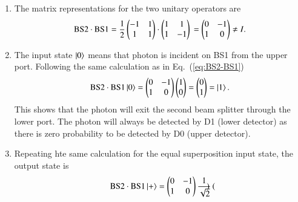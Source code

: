 \begin{solution}
\begin{enumerate}[label=(\alph*)]
    \item The matrix representations for the two unitary operators are
    \begin{equation*}
        \text{BS2}\cdot\text{BS1} = \frac{1}{2}\begin{pmatrix}
            -1 & 1 \\
            1 & 1
        \end{pmatrix} \cdot \begin{pmatrix}
            1 & 1 \\
            1 & -1
        \end{pmatrix} \\
        = \begin{pmatrix}
            0 & -1 \\
            1 & 0
        \end{pmatrix} \neq I.
    \end{equation*}
    \item The input state $\left| 0 \right\rangle$ means that photon is incident on BS1 from the upper port. Following the same calculation as in Eq.~(\ref{eq:BS2-BS1})
    \begin{equation*}
        \text{BS2}\cdot\text{BS1}\left| 0 \right\rangle = \begin{pmatrix}
            0 & -1 \\ 1 & 0
        \end{pmatrix} \begin{pmatrix}
            1 \\ 0
        \end{pmatrix} = \begin{pmatrix}
            0 \\ 1
        \end{pmatrix} = \left| 1 \right\rangle.
    \end{equation*}
    This shows that the photon will exit the second beam splitter through the lower port.
    The photon will always be detected by D1 (lower detector) as there is zero probability to be detected by D0 (upper detector).
    \item Repeating hte same calculation for the equal superposition input state, the output state is
    \begin{equation*}
        \text{BS2}\cdot\text{BS1}\left| + \right\rangle = \begin{pmatrix}
            0 & -1 \\ 1 & 0
        \end{pmatrix} \frac{1}{\sqrt{2}}\begin{pmatrix}

\end{pmatrix}
\end{equation*}
\end{enumerate}
\end{solution}
